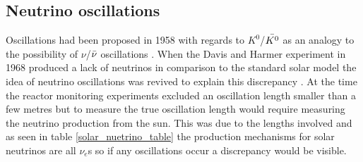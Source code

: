 \documentclass[12pt,a4paper]{article}
\begin{document}

\subsection{Neutrino oscillations} \label{section_neutrino_oscillations}
Oscillations had been proposed in 1958 with regards to $K^0$/$\Bar{K^0}$ as an analogy to the possibility of $\nu$/$\Bar{\nu}$ oscillations \cite{griffiths2008book} \cite{griffiths2008neutrinoOscillations} \cite{pontecorvo1958_OscillationProposal}. When the Davis and Harmer experiment in 1968 produced a lack of neutrinos in comparison to the standard solar model the idea of neutrino oscillations was revived to explain this discrepancy \cite{pontecorvo_gibov_1969_solar_oscillation}. At the time the reactor monitoring experiments excluded an oscillation length smaller than a few metres but to measure the true oscillation length would require measuring the neutrino production from the sun. This was due to the lengths involved \cite{pontecorvo_gibov_1969_solar_oscillation} and as seen in table \ref{solar_nuetrino_table} the production mechanisms for solar neutrinos are all $\nu_e$s so if any oscillations occur a discrepancy would be visible. 
\end{document}
